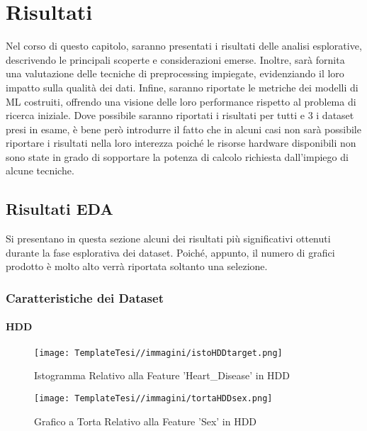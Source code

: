 \chapter{Risultati}
\label{ch:capitolo4}

Nel corso di questo capitolo, saranno presentati i risultati delle  analisi esplorative, descrivendo le principali scoperte e considerazioni emerse. Inoltre, sarà fornita una valutazione delle tecniche di preprocessing impiegate, evidenziando il loro impatto sulla qualità dei dati. Infine, saranno riportate le metriche dei modelli di ML costruiti, offrendo una visione  delle loro performance rispetto al problema di ricerca iniziale.
Dove possibile saranno riportati i risultati per tutti e 3 i dataset presi in esame, è bene però introdurre il fatto che in alcuni casi non sarà possibile riportare i risultati nella loro interezza poiché le risorse hardware disponibili non sono state in grado di sopportare la potenza di calcolo richiesta dall'impiego di alcune tecniche. 


\section{Risultati EDA}
Si presentano in questa sezione alcuni dei risultati più significativi ottenuti durante la fase esplorativa dei dataset.
Poiché, appunto, il numero di grafici prodotto è molto alto verrà riportata soltanto una selezione.

\subsection{Caratteristiche dei Dataset}
\subsubsection{HDD}


\begin{figure}[H]
    \centering
    \texttt{[image: TemplateTesi//immagini/istoHDDtarget.png]}
    \caption{Istogramma Relativo alla Feature 'Heart\_Disease' in HDD}
    \label{fig:istoHDDtarget}
\end{figure}
\begin{figure}[H]
    \centering
    \texttt{[image: TemplateTesi//immagini/tortaHDDsex.png]}
    \caption{Grafico a Torta Relativo alla Feature 'Sex' in HDD}
    \label{fig:tortaHDDsex}
\end{figure}

